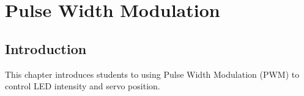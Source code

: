 \chapter{Pulse Width Modulation}

\section{Introduction}
This chapter introduces students to using Pulse Width Modulation (PWM) to control LED intensity
and servo position.
